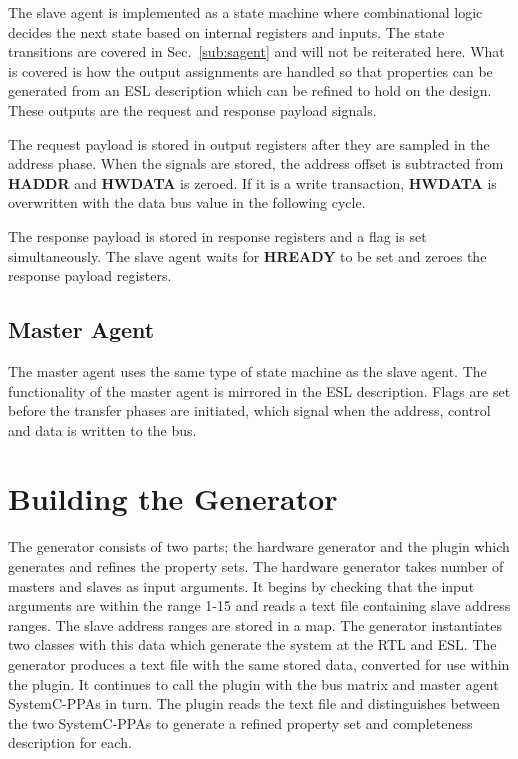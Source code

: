 The slave agent is implemented as a state machine where combinational logic decides the next state based on internal registers and inputs. The state transitions are covered in Sec.~\ref{sub:sagent} and will not be reiterated here. What is covered is how the output assignments are handled so that properties can be generated from an ESL description which can be refined to hold on the design. These outputs are the request and response payload signals. \par
The request payload is stored in output registers after they are sampled in the address phase. When the signals are stored, the address offset is subtracted from \textbf{HADDR} and \textbf{HWDATA} is zeroed. If it is a write transaction, \textbf{HWDATA} is overwritten with the data bus value in the following cycle. \par
The response payload is stored in response registers and a flag is set simultaneously. The slave agent waits for \textbf{HREADY} to be set and zeroes the response payload registers.  



\subsection{Master Agent}
The master agent uses the same type of state machine as the slave agent. The functionality of the master agent is mirrored in the ESL description. Flags are set before the transfer phases are initiated, which signal when the address, control and data is written to the bus. 


\section{Building the Generator}
The generator consists of two parts; the hardware generator and the plugin which generates and refines the property sets. The hardware generator takes number of masters and slaves as input arguments. It begins by checking that the input arguments are within the range 1-15 and reads a text file containing slave address ranges. The slave address ranges are stored in a map. The generator instantiates two classes with this data which generate the system at the RTL and ESL. The generator produces a text file with the same stored data, converted for use within the plugin. It continues to call the plugin with the bus matrix and master agent SystemC-PPAs in turn. The plugin reads the text file and distinguishes between the two SystemC-PPAs to generate a refined property set and completeness description for each. 

